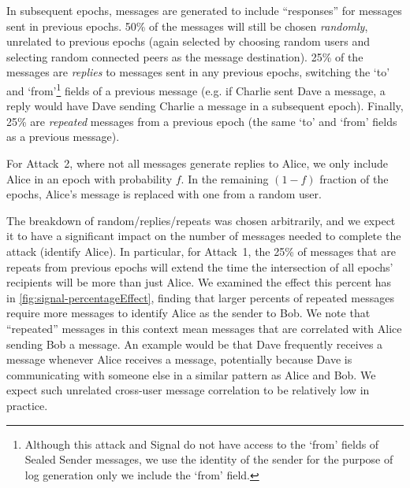 In subsequent epochs, messages are generated to include ``responses'' for
messages sent in previous epochs. 50\% of the messages will still be chosen {\em
randomly}, unrelated to previous epochs (again selected by choosing random users
and selecting random connected peers as the message destination). 25\% of the
messages are {\em replies} to messages sent in any previous epochs, switching
the `to' and `from'\footnote{Although this attack and Signal do not have access
to the `from' fields of Sealed Sender messages, we use the identity of the
sender for the purpose of log generation only we include the `from' field.}
fields of a previous message (e.g. if Charlie sent Dave a message, a reply would
have Dave sending Charlie a message in a subsequent epoch).  Finally, 25\% are
{\em repeated} messages from a previous epoch (the same `to' and `from' fields
as a previous message).

For Attack~2, where not all messages generate replies to Alice, we only include
Alice in an epoch with probability $f$.  In the remaining $(1-f)$ fraction of
the epochs, Alice's message is replaced with one from a random user.


The breakdown of random/replies/repeats was chosen arbitrarily, and we
expect it to have a significant impact on the number of messages needed to
complete the attack (identify Alice). In particular, for Attack~1, the 25\% of
messages that are repeats from previous epochs will extend the time the
intersection of all epochs' recipients will be more than just Alice. We examined
the effect this percent has in \cref{fig:signal-percentageEffect}, finding that
larger percents of repeated messages require more messages to identify Alice as
the sender to Bob. We note that ``repeated'' messages in this context mean
messages that are correlated with Alice sending Bob a message. An example would
be that Dave frequently receives a message whenever Alice receives a message,
potentially because Dave is communicating with someone else in a similar pattern
as Alice and Bob. We expect such
unrelated cross-user message correlation to be relatively low in practice.

